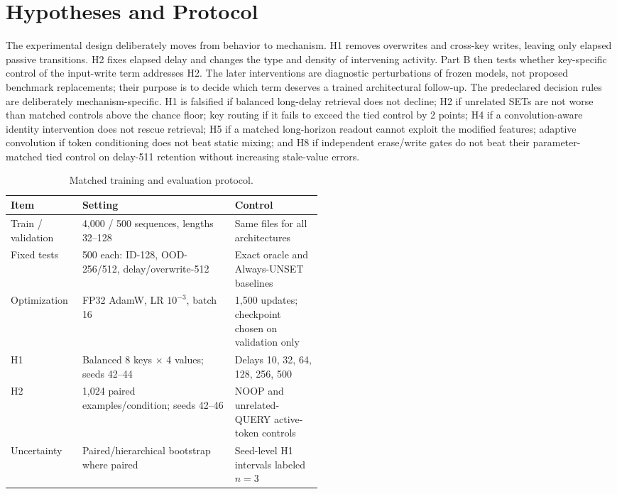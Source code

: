\documentclass[10pt,a4paper]{article}
\begin{document}
\section{Hypotheses and Protocol}
The experimental design deliberately moves from behavior to mechanism. H1 removes overwrites and cross-key writes, leaving only elapsed passive transitions. H2 fixes elapsed delay and changes the type and density of intervening activity. Part B then tests whether key-specific control of the input-write term addresses H2. The later interventions are diagnostic perturbations of frozen models, not proposed benchmark replacements; their purpose is to decide which term deserves a trained architectural follow-up.
The predeclared decision rules are deliberately mechanism-specific. H1 is falsified if balanced long-delay retrieval does not decline; H2 if unrelated SETs are not worse than matched controls above the chance floor; key routing if it fails to exceed the tied control by 2 points; H4 if a convolution-aware identity intervention does not rescue retrieval; H5 if a matched long-horizon readout cannot exploit the modified features; adaptive convolution if token conditioning does not beat static mixing; and H8 if independent erase/write gates do not beat their parameter-matched tied control on delay-511 retention without increasing stale-value errors.

\addtocounter{table}{1}%
\begin{table}[!htbp]
\centering\small
\caption{Matched training and evaluation protocol.}
\begin{tabularx}{\linewidth}{p{0.23\linewidth}Y p{0.28\linewidth}}
\toprule
Item & Setting & Control \\
\midrule
Train / validation & 4,000 / 500 sequences, lengths 32--128 & Same files for all architectures \\
Fixed tests & 500 each: ID-128, OOD-256/512, delay/overwrite-512 & Exact oracle and Always-UNSET baselines \\
Optimization & FP32 AdamW, LR \(10^{-3}\), batch 16 & 1,500 updates; checkpoint chosen on validation only \\
H1 & Balanced 8 keys \(\times\) 4 values; seeds 42--44 & Delays 10, 32, 64, 128, 256, 500 \\
H2 & 1,024 paired examples/condition; seeds 42--46 & NOOP and unrelated-QUERY active-token controls \\
Uncertainty & Paired/hierarchical bootstrap where paired & Seed-level H1 intervals labeled \(n=3\) \\
\bottomrule
\end{tabularx}
\end{table}
\end{document}
